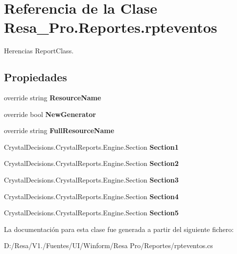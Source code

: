 \section{Referencia de la Clase Resa\+\_\+\+Pro.\+Reportes.\+rpteventos}
\label{class_resa___pro_1_1_reportes_1_1rpteventos}


Herencias Report\+Class.

\subsection*{Propiedades}
\begin{DoxyCompactItemize}
\item 
override string {\bfseries Resource\+Name}\hspace{0.3cm}{\ttfamily  [get, set]}\label{class_resa___pro_1_1_reportes_1_1rpteventos_ab8b5817b423392acd95e627a9640881d}

\item 
override bool {\bfseries New\+Generator}\hspace{0.3cm}{\ttfamily  [get, set]}\label{class_resa___pro_1_1_reportes_1_1rpteventos_ac1943809d3bcf2814392cffc09f8eb18}

\item 
override string {\bfseries Full\+Resource\+Name}\hspace{0.3cm}{\ttfamily  [get, set]}\label{class_resa___pro_1_1_reportes_1_1rpteventos_a639aaafc5a4070c42c37a6ced78c8b49}

\item 
Crystal\+Decisions.\+Crystal\+Reports.\+Engine.\+Section {\bfseries Section1}\hspace{0.3cm}{\ttfamily  [get]}\label{class_resa___pro_1_1_reportes_1_1rpteventos_a2ab62776ef3b8780ea01fe42bf37a3cc}

\item 
Crystal\+Decisions.\+Crystal\+Reports.\+Engine.\+Section {\bfseries Section2}\hspace{0.3cm}{\ttfamily  [get]}\label{class_resa___pro_1_1_reportes_1_1rpteventos_a9ed3ec1301fb0fc8678aa6bf5cc59a31}

\item 
Crystal\+Decisions.\+Crystal\+Reports.\+Engine.\+Section {\bfseries Section3}\hspace{0.3cm}{\ttfamily  [get]}\label{class_resa___pro_1_1_reportes_1_1rpteventos_a032a3d57fa175cfeddf06b6b5f72e7e4}

\item 
Crystal\+Decisions.\+Crystal\+Reports.\+Engine.\+Section {\bfseries Section4}\hspace{0.3cm}{\ttfamily  [get]}\label{class_resa___pro_1_1_reportes_1_1rpteventos_abcdc5fa98eed77a8c2a0bf62a0b446d7}

\item 
Crystal\+Decisions.\+Crystal\+Reports.\+Engine.\+Section {\bfseries Section5}\hspace{0.3cm}{\ttfamily  [get]}\label{class_resa___pro_1_1_reportes_1_1rpteventos_a8e76b1e389de52505f416074946e9396}

\end{DoxyCompactItemize}


La documentación para esta clase fue generada a partir del siguiente fichero\+:\begin{DoxyCompactItemize}
\item 
D\+:/\+Resa/\+V1./\+Fuentes/\+U\+I/\+Winform/\+Resa Pro/\+Reportes/rpteventos.\+cs\end{DoxyCompactItemize}
